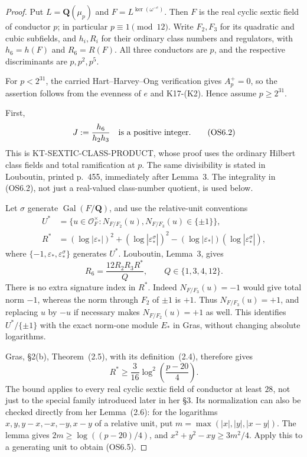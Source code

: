 \begin{proof}
Put $L=\mathbf Q(\mu_p)$ and
$F=L^{\ker(\omega^{-e})}$.  Then $F$ is the real cyclic
sextic field of conductor $p$; in particular $p\equiv1\pmod{12}$.
Write $F_2,F_3$ for its quadratic and cubic subfields,
and $h_i,R_i$ for their ordinary class numbers and regulators,
with $h_6=h(F)$ and $R_6=R(F)$.  All three conductors are $p$,
and the respective discriminants are $p,p^2,p^5$.

For $p<2^{31}$, the carried Hart--Harvey--Ong verification
gives $A_p^+=0$, so the assertion follows from the evenness
of $e$ and K17-(K2).  Hence assume $p\ge2^{31}$.

First,
\[
                         J:=\frac{h_6}{h_2h_3}
                            \quad\hbox{is a positive integer}. \tag{OS6.2}
\]
This is KT-SEXTIC-CLASS-PRODUCT, whose proof uses the ordinary
Hilbert class fields and total ramification at $p$.
The same divisibility is stated in Louboutin, printed p.~455,
immediately after Lemma~3.  The integrality in (OS6.2),
not just a real-valued class-number quotient, is used below.

Let $\sigma$ generate $\operatorname{Gal}(F/\mathbf Q)$,
and use the relative-unit conventions
\[
\begin{split}
 U^*&=\{u\in\mathcal O_F^\times:
       N_{F/F_2}(u),N_{F/F_3}(u)\in\{\pm1\}\},\\
 R^*&=(\log|\varepsilon_*|)^2+
       (\log|\varepsilon_*^\sigma|)^2
       -(\log|\varepsilon_*|)(\log|\varepsilon_*^\sigma|),
\end{split}                                                   \tag{OS6.3}
\]
where $\{-1,\varepsilon_*,\varepsilon_*^\sigma\}$ generates
$U^*$.  Louboutin, Lemma~3, gives
\[
                 R_6=\frac{12R_2R_3R^*}{Q},
                 \qquad Q\in\{1,3,4,12\}.             \tag{OS6.4}
\]
There is no extra signature index in $R^*$.
Indeed $N_{F/F_3}(u)=-1$ would give total norm $-1$,
whereas the norm through $F_2$ of $\pm1$ is $+1$.
Thus $N_{F/F_3}(u)=+1$, and replacing $u$ by $-u$
if necessary makes $N_{F/F_2}(u)=+1$ as well.
This identifies $U^*/\{\pm1\}$ with the exact norm-one
module $E_*$ in Gras, without changing absolute logarithms.

Gras, \S2(b), Theorem~(2.5), with its definition~(2.4),
therefore gives
\[
                    R^*\ge\frac3{16}
                    \log^2\!\left(\frac{p-20}{4}\right).
                                                               \tag{OS6.5}
\]
The bound applies to every real cyclic sextic field of
conductor at least $28$, not just to the special family
introduced later in her \S3.  Its normalization can also
be checked directly from her Lemma~(2.6): for the logarithms
$x,y,y-x,-x,-y,x-y$ of a relative unit, put
$m=\max(|x|,|y|,|x-y|)$.  The lemma gives
$2m\ge\log((p-20)/4)$, and
$x^2+y^2-xy\ge3m^2/4$.  Apply this to a generating unit
to obtain (OS6.5).


\end{proof}
